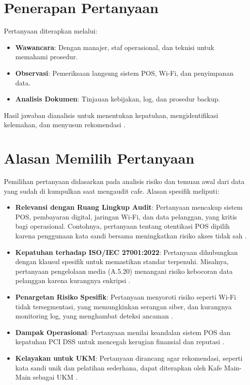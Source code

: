 \documentclass[12pt, a4paper]{report}
\begin{document}
\section{Penerapan Pertanyaan}
Pertanyaan diterapkan melalui:
\begin{itemize}
    \item \textbf{Wawancara}: Dengan manajer, staf operasional, dan teknisi untuk memahami prosedur.
    \item \textbf{Observasi}: Pemeriksaan langsung sistem POS, Wi-Fi, dan penyimpanan data.
    \item \textbf{Analisis Dokumen}: Tinjauan kebijakan, log, dan prosedur backup.
\end{itemize}
Hasil jawaban dianalisis untuk menentukan kepatuhan, mengidentifikasi kelemahan, dan menyusun rekomendasi \citep{frangky2024implementasi}.

\section{Alasan Memilih Pertanyaan}
Pemilihan pertanyaan didasarkan pada analisis risiko dan temuan awal dari data yang sudah di kumpulkan saat mengaudit cafe. Alasan spesifik meliputi:
\begin{itemize}
    \item \textbf{Relevansi dengan Ruang Lingkup Audit}: Pertanyaan mencakup sistem POS, pembayaran digital, jaringan Wi-Fi, dan data pelanggan, yang kritis bagi operasional. Contohnya, pertanyaan tentang otentikasi POS dipilih karena penggunaan kata sandi bersama meningkatkan risiko akses tidak sah \citep{widodo2022keamanan}.
    \item \textbf{Kepatuhan terhadap ISO/IEC 27001:2022}: Pertanyaan dihubungkan dengan klausul spesifik untuk memastikan standar terpenuhi. Misalnya, pertanyaan pengelolaan media (A.5.20) menangani risiko kebocoran data pelanggan karena kurangnya enkripsi \citep{ratnasari2021pelindungan}.
    \item \textbf{Penargetan Risiko Spesifik}: Pertanyaan menyoroti risiko seperti Wi-Fi tidak tersegmentasi, yang memungkinkan serangan siber, dan kurangnya monitoring log, yang menghambat deteksi ancaman \citep{haryanto2021wifi, sari2023backup}.
    \item \textbf{Dampak Operasional}: Pertanyaan menilai keandalan sistem POS dan kepatuhan PCI DSS untuk mencegah kerugian finansial dan reputasi \citep{permatasari2023manajemen}.
    \item \textbf{Kelayakan untuk UKM}: Pertanyaan dirancang agar rekomendasi, seperti kata sandi unik dan pelatihan sederhana, dapat diterapkan oleh Kafe Main-Main sebagai UKM \citep{rokhman2018implementasi}.
\end{itemize}
\end{document}
